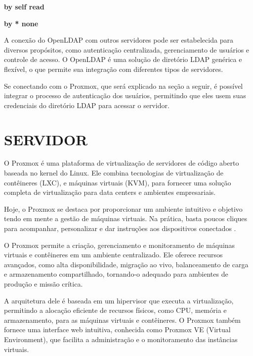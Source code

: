 \textbf{by self read}

\textbf{by * none}

A conexão do OpenLDAP com outros servidores pode ser estabelecida para diversos propósitos, como autenticação centralizada, gerenciamento de usuários e controle de acesso. O OpenLDAP é uma solução de diretório LDAP genérica e flexível, o que permite sua integração com diferentes tipos de servidores.

Se conectando com o Proxmox, que será explicado na seção a seguir, é possível integrar o processo de autenticação dos usuários, permitindo que eles usem suas credenciais do diretório LDAP para acessar o servidor.

\section{SERVIDOR}

O Proxmox é uma plataforma de virtualização de servidores de código aberto baseada no kernel do Linux. Ele combina tecnologias de virtualização de contêineres (LXC), e máquinas virtuais (KVM), para fornecer uma solução completa de virtualização para data centers e ambientes empresariais.

Hoje, o Proxmox se destaca por proporcionar um ambiente intuitivo e objetivo tendo em mente a gestão de máquinas virtuais. Na prática, basta poucos cliques para acompanhar, personalizar e dar instruções aos dispositivos conectados \cite{oliveira2022vantagens}.

O Proxmox permite a criação, gerenciamento e monitoramento de máquinas virtuais e contêineres em um ambiente centralizado. Ele oferece recursos avançados, como alta disponibilidade, migração ao vivo, balanceamento de carga e armazenamento compartilhado, tornando-o adequado para ambientes de produção e missão crítica.

A arquitetura dele é baseada em um hipervisor que executa a virtualização, permitindo a alocação eficiente de recursos físicos, como CPU, memória e armazenamento, para as máquinas virtuais e contêineres. O Proxmox também fornece uma interface web intuitiva, conhecida como Proxmox VE (Virtual Environment), que facilita a administração e o monitoramento das instâncias virtuais.

